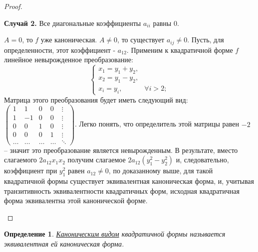 \documentclass[../../main.tex]{subfiles}
\begin{document}
\begin{proof}
\begin{itemize}
	\textbf{Случай 2.} Все диагональные коэффициенты $a_{i i}$ равны 0. 
	\begin{itemize}
		 $A = 0$, то $f$ уже каноническая.
		 $A \ne 0$, то существует $a_{i j} \ne 0$. Пусть, для определенности, этот коэффициент - $a_{1 2}$. Применим к квадратичной форме $f$ линейное невырожденное преобразование:
		\[
			\begin{cases} 
				x_{1} = y_{1} + y_{2}, \\
				x_{2} = y_{1} - y_{2}, \\
				x_{i} = y_{i}, & \forall i > 2;
			\end{cases}
		\]
		Матрица этого преобразования будет иметь следующий вид: 
		$
		\begin{pmatrix}
			1 & 1 & 0 & 0 & \vdots\\
			1 & -1 & 0 & 0 & \vdots \\
			0 & 0 & 1 & 0 & \vdots \\
			0 & 0 & 0 & 1 & \vdots \\
			\dots & \dots & \dots & \dots & \ddots
		\end{pmatrix}
		$. Легко понять, что определитель этой матрицы равен $-2$ -- значит это преобразование является невырожденным. В результате, вместо слагаемого $2 a_{1 2} x_{1} x_{2}$ получим слагаемое $2 a_{1 2} (y^{2}_{1} - y^{2}_{2})$ и, следовательно, коэффициент при $y^{2}_{1}$ равен $a_{1 2} \ne 0$, по доказанному выше, для такой квадратичной формы существует эквивалентная каноническая форма, и, учитывая транзитивность эквивалентности квадратичных форм, исходная квадратичная форма эквивалентна этой канонической форме.
	\end{itemize}
	

	
\end{itemize}


\end{proof}

\newtheorem*{CanonicalViewDef}{Определение}
\begin{CanonicalViewDef}
\underline{Каноническим видом} квадратичной формы называется эквивалентная ей каноническая форма.
\end{CanonicalViewDef}
\end{document}
